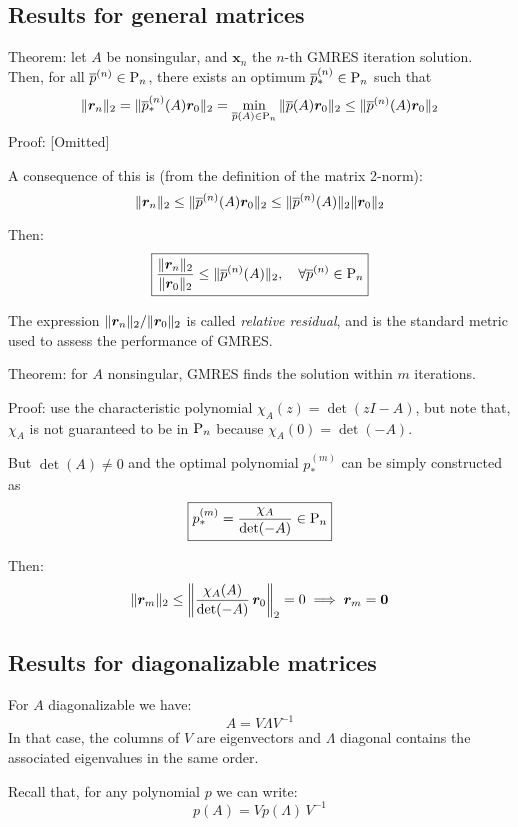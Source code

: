 \documentclass[
  12pt,
  paper=a4,
]{scrartcl} %
\begin{document}
\subsection*{Results for general matrices}

Theorem: let $A$ be nonsingular, and $\bm x_n$ the $n$-th GMRES iteration solution. Then, for all $\overline{p}^{(n)}\in\mathrm{P}_n$, there exists an optimum $\overline{p}_*^{(n)}\in\mathrm{P}_n$ such that
\[
    \|\bm r_n\|_2 =
        \|\overline{p}_*^{(n)}(A)\bm r_0\|_2=
        \min_{\overline{p}(A)\in\mathrm{P}_n}\|\overline{p}(A)\bm r_0\|_2
        \le \|\overline{p}^{(n)}(A)\bm r_0\|_2
\]
Proof: [Omitted]

A consequence of this is (from the definition of the matrix 2-norm):
\[
\|\bm r_n\|_2
    \le
    \|\overline{p}^{(n)}(A)\bm r_0\|_2
    \le
    \|\overline{p}^{(n)}(A)\|_2\|\bm r_0\|_2
\]

Then:
\[
\boxed{
    \frac{\|\bm r_n\|_2}{\|\bm r_0\|_2} \le
        \|\overline{p}^{(n)}(A)\|_2
    ,\quad
    \forall \overline{p}^{(n)}\in\mathrm{P}_n
}
\]

The expression ${\|\bm r_n\|_2}/{\|\bm r_0\|_2}$ is called \emph{relative residual}, and is the standard metric used to assess the performance of GMRES.

Theorem: for $A$ nonsingular, GMRES finds the solution within $m$ iterations.

Proof: use the characteristic polynomial $\chi_A(z)=\det(zI-A)$, but note that, $\chi_A$ is not guaranteed to be in $\mathrm{P}_n$  because $\chi_A(0)=\det(-A)$.

But $\det(A)\neq 0$ and the optimal polynomial $p_*^{(m)}$ can be simply constructed as 
\[
    \boxed{p_*^{(m)} = \frac{\chi_A}{\det(-A)} \in \mathrm{P}_n}
\]

Then:
\[
    \|\bm r_m\|_2 \le
    \left\|\frac{\chi_A(A)}{\det(-A)}\,\bm r_0\right\|_2 = 0
    \implies 
    \bm r_m = \bm 0
\]

\subsection*{Results for diagonalizable matrices}

For $A$ diagonalizable we have:
\[
    A = V \Lambda V^{-1}
\]
In that case, the columns of $V$ are eigenvectors and $\Lambda$ diagonal contains the associated eigenvalues in the same order.

Recall that, for any polynomial $p$ we can write:
\[
    p(A) = V p(\Lambda)\, V^{-1}
\]
\end{document}
